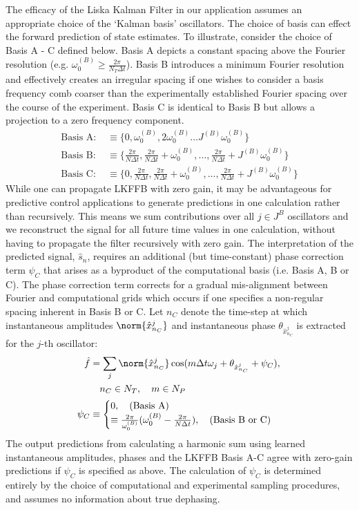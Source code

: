 The efficacy of the Liska Kalman Filter in our application assumes an appropriate choice of the `Kalman basis' oscillators. The choice of basis can effect the forward prediction of state estimates. To illustrate, consider the choice of Basis A - C defined below. Basis A depicts a constant spacing above the Fourier resolution (e.g. $\omega_0^{(B)} \geq \frac{2\pi}{N_T \Delta t}$). Basis B  introduces a minimum Fourier resolution and effectively creates an irregular spacing if one wishes to consider a basis frequency comb coarser than the experimentally established Fourier spacing over the course of the experiment. Basis C is identical to Basis B but allows a projection to a zero frequency component. 
 \begin{align}
 \text{Basis A: } & \equiv \{0, \omega_0^{(B)}, 2\omega_0^{(B)} \dots  J^{(B)} \omega_0^{(B)} \} \\
 \text{Basis B: } & \equiv \{ \frac{2\pi}{N \Delta t}, \frac{2\pi}{N \Delta t} + \omega_0^{(B)} , \dots,   \frac{2\pi}{N \Delta t} + J^{(B)} \omega_0^{(B)} \} \\
 \text{Basis C: } & \equiv \{ 0, \frac{2\pi}{N \Delta t}, \frac{2\pi}{N \Delta t} + \omega_0^{(B)},  \dots,   \frac{2\pi}{N \Delta t} + J^{(B)} \omega_0^{(B)} \} 
 \end{align}
 While one can propagate LKFFB with zero gain, it may be advantageous for predictive control applications to generate predictions in one calculation rather than recursively. This means we sum contributions over all $j\in J^B$ oscillators and we reconstruct the signal for all future time values in one calculation, without having to propagate the filter recursively with zero gain. The interpretation of the predicted signal, $\hat{s}_n$, requires an additional (but time-constant) phase correction term $\psi_C$ that arises as a byproduct of the computational basis (i.e. Basis A, B or C).  The phase correction term corrects for a gradual mis-alignment between Fourier and computational grids which occurs if one specifies a non-regular spacing inherent in Basis B or C. Let $n_C$ denote the time-step at which instantaneous amplitudes $\norm{\hat{x}^j_{n_C}}$ and instantaneous phase $\theta_{\hat{x}^j_{n_C}}$ is extracted for the $j$-th oscillator:
 \begin{align}
 \hat{f} &= \sum_j\norm{\hat{x}^j_{n_C}} \cos(m\Delta t \omega_j + \theta_{\hat{x}^j_{n_C}} + \psi_C), \\
 & \quad  n_C \in N_T, \quad m \in N_P \nonumber \\
 \psi_C & \equiv \begin{cases}
 0,  \quad \text{(Basis A)} \\
 \equiv  \frac{2\pi}{\omega_0^{(B)} } (\omega_0^{(B)} - \frac{2\pi}{N \Delta t}), \quad \text{(Basis B or C)} \\
 \end{cases}
 \end{align}
 The output predictions from calculating a harmonic sum using learned instantaneous amplitudes, phases and the LKFFB Basis A-C agree with zero-gain predictions if $\psi_C$ is specified as above. The calculation of $\psi_C$ is determined entirely by the choice of computational and experimental sampling procedures, and assumes no information about true dephasing.  
 
